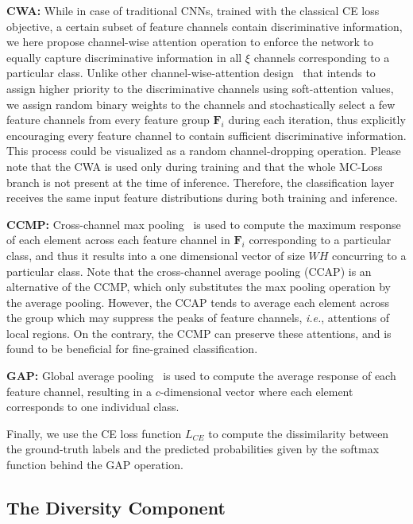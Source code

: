 \documentclass[journal]{IEEEtran}
\begin{document}
\noindent \textbf{CWA:} While in case of traditional CNNs, trained with the classical CE loss objective, a certain subset of feature channels contain discriminative information, we here propose channel-wise attention operation to enforce the network to equally capture discriminative information in all $\xi$ channels corresponding to a particular class.  Unlike other channel-wise-attention design~\cite{chen2017sca} that intends to assign higher priority to the discriminative channels using soft-attention values, we assign random binary weights to the channels and stochastically select a few feature channels from every feature group $\mathbf{F}_i$ during each iteration, thus explicitly encouraging every feature channel to contain sufficient discriminative information. This process could be visualized as a random channel-dropping operation. Please note that the CWA is used only during training and that the whole MC-Loss branch is not present at the time of inference. Therefore, the classification layer receives the same input feature distributions during both training and inference.


\noindent \textbf{CCMP:} Cross-channel max pooling~\cite{goodfellow2013maxout} is used to compute the maximum response of each element across each feature channel in $\mathbf{F}_i$ corresponding to a particular class, and thus it results into a one dimensional vector of size $W\!H$ concurring to a particular class. Note that the cross-channel average pooling (CCAP) is an alternative of the CCMP, which only substitutes the max pooling operation by the average pooling. However, the CCAP tends to average each element across the group which may suppress the peaks of feature channels, \emph{i.e.}, attentions of local regions. On the contrary, the CCMP can preserve these attentions, and is found to be beneficial for fine-grained classification.

\noindent \textbf{GAP:} Global average pooling~\cite{lin2013network} is used to compute the average response of each feature channel, resulting in a $c$-dimensional vector where each element corresponds to one individual class.

Finally, we use the CE loss function $L_{CE}$ to compute the dissimilarity between the ground-truth labels and the predicted probabilities given by the softmax function behind the GAP operation.




\subsection{The Diversity Component}
\end{document}
